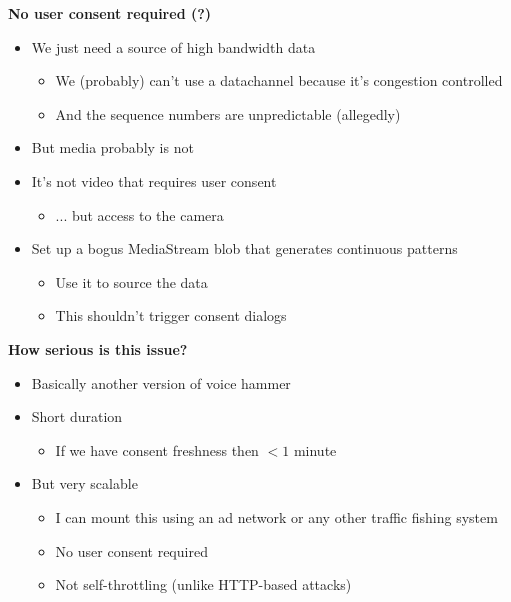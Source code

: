 \documentclass[helvetica]{seminar}
\newcommand{\heading}[1]{%
  \begin{center} 
    \large\bf 
    #1 
  \end{center} 
  \vspace{.4 in}}
\begin{document}
\begin{slide}
\heading{No user consent required (?)}

\begin{itemize}
\item We just need a source of high bandwidth data
  \begin{itemize}
  \item We (probably) can't use a datachannel because it's congestion controlled
  \item And the sequence numbers are unpredictable (allegedly)
  \end{itemize}

\item But media probably is not

\item It's not video that requires user consent
  \begin{itemize}
  \item ... but access to the camera
  \end{itemize}

\item Set up a bogus MediaStream blob that generates continuous patterns
  \begin{itemize}
  \item Use it to source the data
  \item This shouldn't trigger consent dialogs
  \end{itemize}
\end{itemize}
\end{slide}


\begin{slide}
\heading{How serious is this issue?}

\begin{itemize}
  \item Basically another version of voice hammer
  \item Short duration
    \begin{itemize}
    \item If we have consent freshness then $< 1$ minute
    \end{itemize}

  \item But very scalable
    \begin{itemize}
    \item I can mount this using an ad network or any other traffic fishing system
    \item No user consent required
    \item Not self-throttling (unlike HTTP-based attacks)
    \end{itemize}
\end{itemize}
\end{slide}
\end{document}
